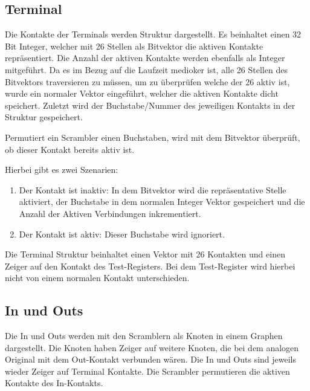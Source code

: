 \subsection{Terminal}\label{subsec:impl_terminal}
Die Kontakte der Terminals werden Struktur dargestellt.
Es beinhaltet einen 32 Bit Integer, welcher mit 26 Stellen als Bitvektor die aktiven Kontakte repräsentiert.
Die Anzahl der aktiven Kontakte werden ebenfalls als Integer mitgeführt.
Da es im Bezug auf die Laufzeit medioker ist, alle 26 Stellen des Bitvektors traversieren zu müssen, um zu überprüfen welche der 26 aktiv ist, wurde ein normaler Vektor eingeführt, welcher die aktiven Kontakte \glqq dicht\grqq{} speichert. 
Zuletzt wird der Buchstabe/Nummer des jeweiligen Kontakts in der Struktur gespeichert.

\noindent


Permutiert ein Scrambler einen Buchstaben, wird mit dem Bitvektor überprüft, ob dieser Kontakt bereits aktiv ist.

Hierbei gibt es zwei Szenarien:
\begin{enumerate}
	\item Der Kontakt ist inaktiv: In dem Bitvektor wird die repräsentative Stelle aktiviert, der Buchstabe in dem normalen Integer Vektor gespeichert und die Anzahl der Aktiven Verbindungen inkrementiert.
	
	\item Der Kontakt ist aktiv: Dieser Buchstabe wird ignoriert. 
\end{enumerate}

Die Terminal Struktur beinhaltet einen Vektor mit 26 Kontakten und einen Zeiger auf den Kontakt des Test-Registers.
Bei dem Test-Register wird hierbei nicht von einem \glqq normalen\grqq{} Kontakt unterschieden.


\subsection{In und Outs}\label{subsec:impl_in_und_outs}
Die In und Outs werden mit den Scramblern als Knoten in einem Graphen dargestellt.
Die Knoten haben Zeiger auf weitere Knoten, die bei dem analogen Original mit dem Out-Kontakt verbunden wären.
Die In und Outs sind jeweils wieder Zeiger auf Terminal Kontakte.
Die Scrambler permutieren die aktiven Kontakte des In-Kontakts.

